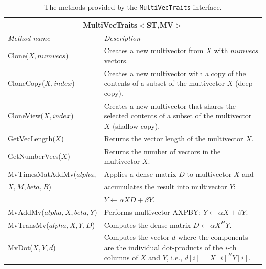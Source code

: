 \documentclass[acmtoms]{acmtrans2m}
\newcommand{\aspace}[1]{\texttt{#1}}
\begin{document}
\begin{table}
\begin{center}
  \caption{The methods provided by the \aspace{MultiVecTraits} interface.}
\label{tab:anasazi:mvt}
\begin{tabular}{| p{4cm} | p{8cm} |}
\hline
\multicolumn{2}{|c|}{\textbf{MultiVecTraits$<$ST,MV$>$}} \\\hline
\emph{Method name} & \emph{Description} \\\hline
Clone($X,numvecs$)           & Creates a new multivector from $X$ with
$numvecs$ vectors.  \\\hline

CloneCopy($X,index$) & Creates a new multivector with a copy of the contents of
a subset of the multivector $X$ (deep copy). \\\hline

CloneView($X,index$) & Creates a new multivector that shares the selected
contents of a subset of the multivector $X$ (shallow copy).  \\\hline

GetVecLength($X$) & Returns the vector length of the multivector $X$.
\\\hline

GetNumberVecs($X$)& Returns the number of vectors in the multivector $X$.
\\\hline

MvTimesMatAddMv($alpha,$ & Applies a dense matrix $D$ to multivector $X$ and \\ 
           $X,M,beta,B$) & accumulates the result into multivector $Y$:\\ & $Y \leftarrow \alpha X D + \beta Y$.  \\\hline

MvAddMv($alpha,X,beta,Y$)  & Performs multivector AXPBY: $Y \leftarrow \alpha X + \beta Y$.
\\\hline

MvTransMv($alpha,X,Y,D$) & Computes the dense matrix $D \leftarrow \alpha X^H Y$.
\\\hline

MvDot($X,Y,d$) & Computes the vector $d$ where the components are the
individual dot-products of the $i$-th columns of $X$ and $Y$, i.e.,
$d[i] = X[i]^H Y[i]$.  \\\hline


\end{tabular}
\end{center}
\end{table}
\end{document}
